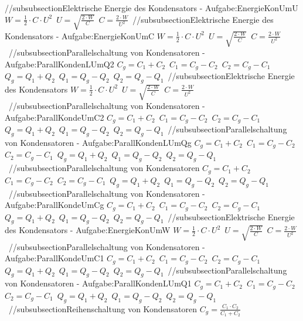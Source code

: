 //subsubsection{Elektrische Energie des Kondensators - Aufgabe:EnergieKonUmU} 
$ W =\frac{1}{2}\cdot C\cdot U^{2} $\ 
$ U = \sqrt{\frac{2\cdot W}{ C}} $\ 
$ C = \frac{2\cdot W}{ U^{2} } $\ 
//subsubsection{Elektrische Energie des Kondensators - Aufgabe:EnergieKonUmC} 
$ W =\frac{1}{2}\cdot C\cdot U^{2} $\ 
$ U = \sqrt{\frac{2\cdot W}{ C}} $\ 
$ C = \frac{2\cdot W}{ U^{2} } $\ 
//subsubsection{Parallelschaltung von Kondensatoren - Aufgabe:ParallKondenLUmQ2} 
$ C_{g}  = C_{1}  + C_{2} $\ 
$ C_{1}  = C_{g}  - C_{2} $\ 
$ C_{2}  = C_{g}  - C_{1} $\ 
$ Q_{g}  = Q_{1}  + Q_{2} $\ 
$ Q_{1}  = Q_{g}  - Q_{2} $\ 
$ Q_{2}  = Q_{g}  - Q_{1} $\ 
//subsubsection{Elektrische Energie des Kondensators} 
$ W =\frac{1}{2}\cdot C\cdot U^{2} $\ 
$ U = \sqrt{\frac{2\cdot W}{ C}} $\ 
$ C = \frac{2\cdot W}{ U^{2} } $\ 
//subsubsection{Parallelschaltung von Kondensatoren - Aufgabe:ParallKondeUmC2} 
$ C_{g}  = C_{1}  + C_{2} $\ 
$ C_{1}  = C_{g}  - C_{2} $\ 
$ C_{2}  = C_{g}  - C_{1} $\ 
$ Q_{g}  = Q_{1}  + Q_{2} $\ 
$ Q_{1}  = Q_{g}  - Q_{2} $\ 
$ Q_{2}  = Q_{g}  - Q_{1} $\ 
//subsubsection{Parallelschaltung von Kondensatoren - Aufgabe:ParallKondenLUmQg} 
$ C_{g}  = C_{1}  + C_{2} $\ 
$ C_{1}  = C_{g}  - C_{2} $\ 
$ C_{2}  = C_{g}  - C_{1} $\ 
$ Q_{g}  = Q_{1}  + Q_{2} $\ 
$ Q_{1}  = Q_{g}  - Q_{2} $\ 
$ Q_{2}  = Q_{g}  - Q_{1} $\ 
//subsubsection{Parallelschaltung von Kondensatoren} 
$ C_{g}  = C_{1}  + C_{2} $\ 
$ C_{1}  = C_{g}  - C_{2} $\ 
$ C_{2}  = C_{g}  - C_{1} $\ 
$ Q_{g}  = Q_{1}  + Q_{2} $\ 
$ Q_{1}  = Q_{g}  - Q_{2} $\ 
$ Q_{2}  = Q_{g}  - Q_{1} $\ 
//subsubsection{Parallelschaltung von Kondensatoren - Aufgabe:ParallKondeUmCg} 
$ C_{g}  = C_{1}  + C_{2} $\ 
$ C_{1}  = C_{g}  - C_{2} $\ 
$ C_{2}  = C_{g}  - C_{1} $\ 
$ Q_{g}  = Q_{1}  + Q_{2} $\ 
$ Q_{1}  = Q_{g}  - Q_{2} $\ 
$ Q_{2}  = Q_{g}  - Q_{1} $\ 
//subsubsection{Elektrische Energie des Kondensators - Aufgabe:EnergieKonUmW} 
$ W =\frac{1}{2}\cdot C\cdot U^{2} $\ 
$ U = \sqrt{\frac{2\cdot W}{ C}} $\ 
$ C = \frac{2\cdot W}{ U^{2} } $\ 
//subsubsection{Parallelschaltung von Kondensatoren - Aufgabe:ParallKondeUmC1} 
$ C_{g}  = C_{1}  + C_{2} $\ 
$ C_{1}  = C_{g}  - C_{2} $\ 
$ C_{2}  = C_{g}  - C_{1} $\ 
$ Q_{g}  = Q_{1}  + Q_{2} $\ 
$ Q_{1}  = Q_{g}  - Q_{2} $\ 
$ Q_{2}  = Q_{g}  - Q_{1} $\ 
//subsubsection{Parallelschaltung von Kondensatoren - Aufgabe:ParallKondenLUmQ1} 
$ C_{g}  = C_{1}  + C_{2} $\ 
$ C_{1}  = C_{g}  - C_{2} $\ 
$ C_{2}  = C_{g}  - C_{1} $\ 
$ Q_{g}  = Q_{1}  + Q_{2} $\ 
$ Q_{1}  = Q_{g}  - Q_{2} $\ 
$ Q_{2}  = Q_{g}  - Q_{1} $\ 
//subsubsection{Reihenschaltung von Kondensatoren} 
$ C_{g}  = \frac{C_{1} \cdot C_{2} }{C_{1} +C_{2} } $\ 
